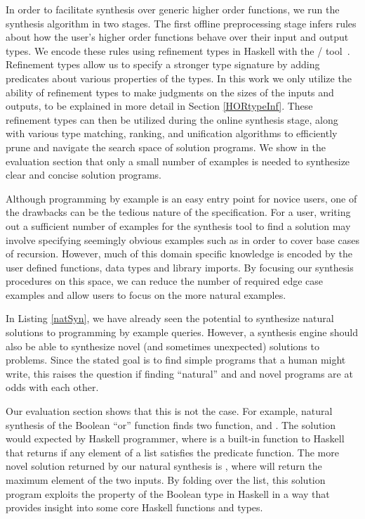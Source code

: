In order to facilitate synthesis over generic higher order functions, we run the synthesis algorithm in two stages.
The first offline preprocessing stage infers rules about how the user's higher order functions behave over their input and output types.
We encode these rules using refinement types in Haskell with the \lhask/ tool~\cite{DBLP:conf/haskell/VazouSJ14}.
Refinement types allow us to specify a stronger type signature by adding predicates about various properties of the types.
In this work we only utilize the ability of refinement types to make judgments on the sizes of the inputs and outputs, to be explained in more detail in Section \ref{HORtypeInf}.
These refinement types can then be utilized during the online synthesis stage, along with various type matching, ranking, and unification algorithms to efficiently prune and navigate the search space of solution programs.
We show in the evaluation section that only a small number of examples is needed to synthesize clear and concise solution programs.

Although programming by example is an easy entry point for novice users, one of the drawbacks can be the tedious nature of the specification.
For a user, writing out a sufficient number of examples for the synthesis tool to find a solution may involve
  specifying seemingly obvious examples such as \codeinline{[]->[]} in order to cover base cases of recursion.
However, much of this domain specific knowledge is encoded by the user defined functions, data types and library imports. By focusing our synthesis procedures on this space, we can reduce the number of required edge case examples and allow users to focus on the more natural examples.

In Listing \ref{natSyn}, we have already seen the potential to synthesize natural solutions to programming by example queries.
However, a synthesis engine should also be able to synthesize novel (and sometimes unexpected) solutions to problems.
Since the stated goal is to find simple programs that a human might write, this raises the question if finding ``natural'' and and novel programs are at odds with each other.

Our evaluation section shows that this is not the case.
For example, natural synthesis of the Boolean ``or'' function finds two function,  and .
The  solution would expected by Haskell programmer, where  is a built-in function to Haskell that returns  if any element of a list satisfies the predicate function.
The more novel solution returned by our natural synthesis is , where  will return the maximum element of the two inputs.
By folding over the list, this solution program exploits the  property of the Boolean type in Haskell in a way that provides insight into some core Haskell functions and types.

